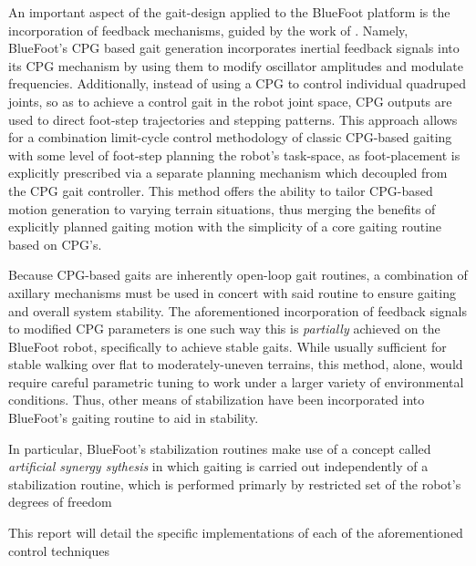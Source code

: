 		An important aspect of the gait-design applied to the BlueFoot platform is the incorporation of feedback mechanisms, guided by the work of \cite{Fukuoka2003,Endo2004}. Namely, BlueFoot's CPG based gait generation incorporates inertial feedback signals into its CPG mechanism by using them to modify oscillator amplitudes and modulate frequencies. Additionally, instead of using a CPG to control individual quadruped joints, so as to achieve a control gait in the robot joint space, CPG outputs are used to direct foot-step trajectories and stepping patterns. This approach allows for a combination limit-cycle control methodology of classic CPG-based gaiting with some level of foot-step planning the robot's task-space, as foot-placement is explicitly prescribed via a separate planning mechanism which decoupled from the CPG gait controller. This method offers the ability to tailor CPG-based motion generation to varying terrain situations, thus merging the benefits of explicitly planned gaiting motion with the simplicity of a core gaiting routine based on CPG's.

		Because CPG-based gaits are inherently open-loop gait routines, a combination of axillary mechanisms must be used in concert with said routine to ensure gaiting and overall system stability. The aforementioned incorporation of feedback signals to modified CPG parameters is one such way this is \emph{partially} achieved on the BlueFoot robot, specifically to achieve stable gaits. While usually sufficient for stable walking over flat to moderately-uneven terrains, this method, alone, would require careful parametric tuning to work under a larger variety of environmental conditions. Thus, other means of stabilization have been incorporated into BlueFoot's gaiting routine to aid in stability.

		In particular, BlueFoot's stabilization routines make use of a concept called \emph{artificial synergy sythesis} in which gaiting is carried out independently of a stabilization routine, which is performed primarly by restricted set of the robot's degrees of freedom \cite{Vuko1972}
			

		This report will detail the specific implementations of each of the aforementioned control techniques